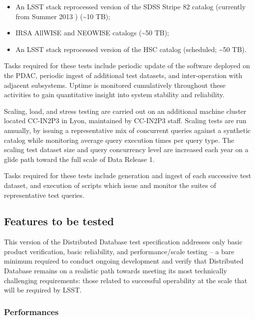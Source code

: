 \documentclass[DM,lsstdraft,STS,toc]{lsstdoc}
\def\product{Distributed Database}
\begin{document}
\begin{itemize}
  \item{An LSST stack reprocessed version of the SDSS Stripe 82 catalog (currently from Summer 2013 ) ({\textasciitilde{}}10 TB);}
  \item{IRSA AllWISE and NEOWISE catalogs ({\textasciitilde{}}50 TB);}
  \item{An LSST stack reprocessed version of the HSC catalog (scheduled; {\textasciitilde{}}50 TB).}
\end{itemize}

Tasks required for these tests include periodic update of the software deployed on the PDAC,
periodic ingest of additional test datasets, and inter-operation with adjacent subsystems.  Uptime
is monitored cumulatively throughout these activities to gain quantitative insight into system
stability and reliability.

Scaling, load, and stress testing are carried out on an additional machine cluster located
CC-IN2P3 in Lyon, maintained by CC-IN2P3 staff. Scaling tests are run annually, by issuing
a representative mix of concurrent queries against a synthetic catalog while monitoring
average query execution times per query type.  The scaling test dataset size and query
concurrency level are increased each year on a glide path toward the full scale of Data Release 1.

Tasks required for these tests include generation and ingest of each successive test dataset, and
execution of scripts which issue and monitor the suites of representative test queries.

\subsection{Features to be tested}
\label{sec:feat2test}

This version of the \product{} test specification addresses only basic product verification, basic
reliability, and performance/scale testing -- a bare minimum required to conduct ongoing development
and verify that \product{} remains on a realistic path towards meeting its most technically challenging
requirements: those related to successful operability at the scale that will be required by LSST.


\subsubsection{Performances}
\end{document}
